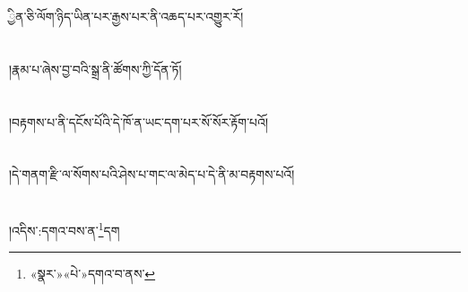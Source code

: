 ྱིན་ཅི་ལོག་ཉིད་ཡིན་པར་རྒྱས་པར་ནི་འཆད་པར་འགྱུར་རོ།\chapter{ }།རྣམ་པ་ཞེས་བྱ་བའི་སྒྲ་ནི་ཚོགས་ཀྱི་དོན་ཏོ།\chapter{ }།བརྟགས་པ་ནི་དངོས་པོའི་དེ་ཁོ་ན་ཡང་དག་པར་སོ་སོར་རྟོག་པའོ།\chapter{ }།དེ་གནག་རྫི་ལ་སོགས་པའི་ཤེས་པ་གང་ལ་མེད་པ་དེ་ནི་མ་བརྟགས་པའོ།\chapter{ }།འདིས་:དགའ་བས་ན་\footnote{«སྣར་»«པེ་»དགའ་བ་ནས་}དག